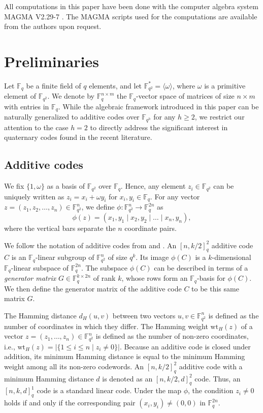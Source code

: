 \documentclass[a4paper,12pt]{article}
\theoremstyle{plain}
\theoremstyle{definition}
\begin{document}
All computations in this paper have been done with the computer algebra system MAGMA V2.29-7 \cite{magma}. The MAGMA scripts used for the computations are available from the authors upon request.

\section{Preliminaries}
Let $\mathbb{F}_q$ be a finite field of $q$ elements, and let $\mathbb{F}_{q^2}^* = \langle \omega \rangle$, where $\omega$ is a primitive element of $\mathbb{F}_{q^2}$. We denote by $\mathbb{F}_{q}^{n \times m}$ the $\mathbb{F}_q$-vector space of matrices of size $n \times m$ with entries in $\mathbb{F}_q$. While the algebraic framework introduced in this paper can be naturally generalized to additive codes over $\mathbb{F}_{q^h}$ for any $h \ge 2$, we restrict our attention to the case $h=2$ to directly address the significant interest in quaternary codes found in the recent literature.

\subsection{Additive codes}
We fix $\{1, \omega\}$ as a basis of $\mathbb{F}_{q^2}$ over $\mathbb{F}_q$. Hence, any element $z_i \in \mathbb{F}_{q^2}$ can be uniquely written as $z_i = x_i + \omega y_i$ for $x_i, y_i \in \mathbb{F}_q$. For any vector $z = (z_1, z_2, \dots, z_n) \in \mathbb{F}_{q^2}^n$, we define $\phi : \mathbb{F}_{q^2}^n \to \mathbb{F}_q^{2n}$ as
\begin{equation*}
\phi(z) = (x_1, y_1 \mid x_2, y_2 \mid \dots \mid x_n, y_n),
\end{equation*}
where the vertical bars separate the $n$ coordinate pairs. 

We follow the notation of additive codes from \cite{ball2026} and \cite{kurz2024}. An $[n, k/2]_q^2$ additive code $C$ is an $\mathbb{F}_q$-linear subgroup of $\mathbb{F}_{q^2}^n$ of size $q^k$. Its image $\phi(C)$ is a $k$-dimensional $\mathbb{F}_q$-linear subspace of $\mathbb{F}_q^{2n}$. 
The subspace $\phi(C)$ can be described in terms of a \textit{generator matrix} $G \in \mathbb{F}_q^{k \times 2n}$ of rank $k$, whose rows form an $\mathbb{F}_q$-basis for $\phi(C)$.
We then define the generator matrix of the additive code $C$ to be this same matrix $G$. 

The Hamming distance $d_H(u, v)$ between two vectors $u, v \in \mathbb{F}_{q^2}^n$ is defined as the number of coordinates in which they differ. The Hamming weight $\text{wt}_H(z)$ of a vector $z = (z_1, \dots, z_n) \in \mathbb{F}_{q^2}^n$ is defined as the number of non-zero coordinates, i.e., $\text{wt}_H(z) = |\{ 1 \le i \le n \mid z_i \neq 0 \}|$. Because an additive code is closed under  addition, its minimum Hamming distance is equal to the minimum Hamming weight among all its non-zero codewords. An $[n, k/2]_q^2$ additive code with a minimum Hamming distance $d$ is denoted as an $[n, k/2, d]_q^2$ code.  Thus, an $[n, k, d]_q^1$ code is a standard linear code. Under the map $\phi$, the condition $z_i \neq 0$ holds if and only if the corresponding pair $(x_i, y_i) \neq (0,0)$ in $\mathbb{F}_q^{2n}$.
\end{document}
